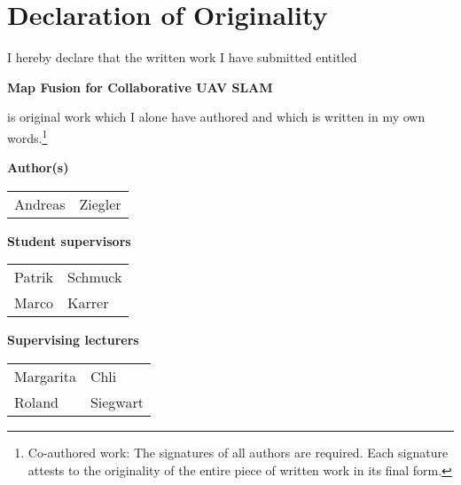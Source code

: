 
\section*{Declaration of Originality}

\vspace{1cm}

I hereby declare that the written work I have submitted entitled

\vspace{0.5cm}

\textbf{Map Fusion for Collaborative UAV SLAM}

\vspace{0.5cm}

is original work which I alone have authored and which is written in my own words.\footnote{Co-authored work: The signatures of all authors are required. Each signature attests to the originality of the entire piece of written work in its final form.}

\vspace{1cm}

\textbf{Author(s)}

\vspace{0.5cm}

\begin{tabular}{ p{5cm} p{5cm} }
  Andreas & Ziegler \\
\end{tabular}

\vspace{0.5cm}

\textbf{Student supervisors}

\vspace{0.5cm}

\begin{tabular}{ p{5cm} p{5cm} }
  Patrik & Schmuck \\
  Marco & Karrer
\end{tabular}

\vspace{0.5cm}

\textbf{Supervising lecturers}

\vspace{0.5cm}

\begin{tabular}{ p{5cm} p{5cm} }
  Margarita & Chli \\
  Roland & Siegwart
\end{tabular}

